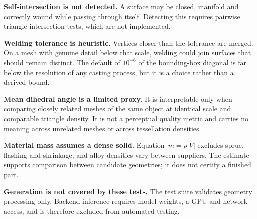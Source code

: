 \documentclass[11pt, a4paper]{article}
\begin{document}
\textbf{Self-intersection is not detected.} A surface may be closed, manifold
and correctly wound while passing through itself. Detecting this requires
pairwise triangle intersection tests, which are not implemented.

\textbf{Welding tolerance is heuristic.} Vertices closer than the tolerance are
merged. On a mesh with genuine detail below that scale, welding could join
surfaces that should remain distinct. The default of $10^{-6}$ of the
bounding-box diagonal is far below the resolution of any casting process, but
it is a choice rather than a derived bound.

\textbf{Mean dihedral angle is a limited proxy.} It is interpretable only when
comparing closely related meshes of the same object at identical scale and
comparable triangle density. It is not a perceptual quality metric and carries
no meaning across unrelated meshes or across tessellation densities.

\textbf{Material mass assumes a dense solid.} Equation~$m = \rho|V|$ excludes
sprue, flashing and shrinkage, and alloy densities vary between suppliers. The
estimate supports comparison between candidate geometries; it does not certify
a finished part.

\textbf{Generation is not covered by these tests.} The test suite validates
geometry processing only. Backend inference requires model weights, a GPU and
network access, and is therefore excluded from automated testing.
\end{document}
